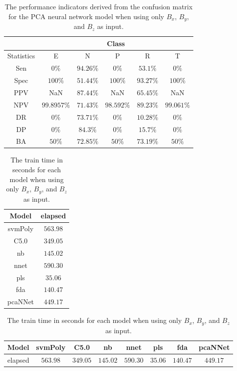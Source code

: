 \begin{table}[!ht]
	\centering
	\begin{tabular}{|c|c|c|c|c|c|}
		\hline
		 & \multicolumn{5}{c|}{Class} \\ \hline
		Statistics & E & N & P & R & T \\ \hline
		Sen & $0\%$ & $94.26\%$ & $0\%$ & $53.1\%$ & $0\%$ \\ \hline
		Spec & $100\%$ & $51.44\%$ & $100\%$ & $93.27\%$ & $100\%$ \\ \hline
		PPV & NaN & $87.44\%$ & NaN & $65.45\%$ & NaN \\ \hline
		NPV & $99.8957\%$ & $71.43\%$ & $98.592\%$ & $89.23\%$ & $99.061\%$ \\ \hline
		DR & $0\%$ & $73.71\%$ & $0\%$ & $10.28\%$ & $0\%$ \\ \hline
		DP & $0\%$ & $84.3\%$ & $0\%$ & $15.7\%$ & $0\%$ \\ \hline
		BA & $50\%$ & $72.85\%$ & $50\%$ & $73.19\%$ & $50\%$ \\ \hline
	\end{tabular}
	\caption{The performance indicators derived from the confusion matrix for the PCA neural network model when using only $B_{x}$, $B_{y}$, and $B_{z}$ as input.}
	\label{tab:cs:reverse:coord:pcaNNet}
\end{table}

\begin{table}[!ht]
	\centering
	\begin{tabular}{|c|c|}
		\hline
		Model & elapsed \\ \hline
		svmPoly & $563.98$ \\ \hline
		C5.0 & $349.05$ \\ \hline
		nb & $145.02$ \\ \hline
		nnet & $590.30$ \\ \hline
		pls & $35.06$ \\ \hline
		fda & $140.47$ \\ \hline
		pcaNNet & $449.17$ \\ \hline
	\end{tabular}
	\caption{The train time in seconds for each model when using only $B_{x}$, $B_{y}$, and $B_{z}$ as input.}
	\label{tab:time:coord:train}
\end{table}

\begin{table}[!ht]
	\centering
	\begin{tabular}{|c|c|c|c|c|c|c|c|}
		\hline
		Model & svmPoly & C5.0 & nb & nnet & pls & fda & pcaNNet \\ \hline
		elapsed & $563.98$ & $349.05$ & $145.02$ & $590.30$ & $35.06$ & $140.47$ & $449.17$ \\ \hline
	\end{tabular}
	\caption{The train time in seconds for each model when using only $B_{x}$, $B_{y}$, and $B_{z}$ as input.}
	\label{tab:time:reverse:coord:train}
\end{table}

